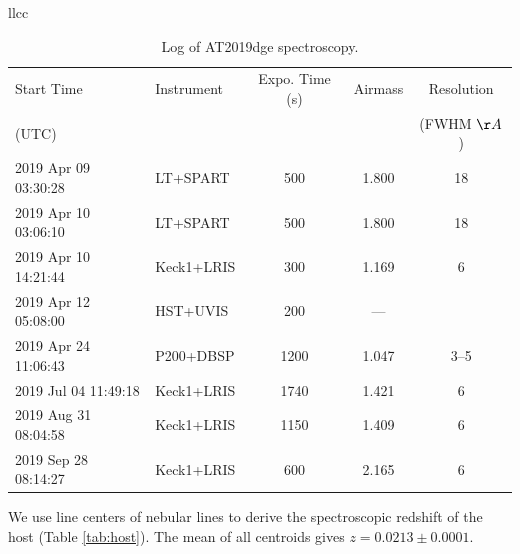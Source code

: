 \documentclass[twocolumn]{aastex63}
\begin{document}
\begin{CJK*}{UTF8}{gbsn}
\begin{table}{llcc}
	\caption{Log of AT2019dge spectroscopy. \label{tab:spec}}
	\centering
	\begin{tabular}{llccc}
	\toprule
	Start Time  & Instrument & Expo. Time (s) & Airmass & Resolution\\
	(UTC) & & & & (FWHM $\AA$)\\
	\midrule
	2019 Apr 09 03:30:28 & LT+SPART  &  500   & 1.800 & 18 \\
	2019 Apr 10 03:06:10 & LT+SPART  &  500   & 1.800 & 18 \\
	2019 Apr 10 14:21:44 & Keck1+LRIS & 300 & 1.169 & 6 \\
	2019 Apr 12 05:08:00 & HST+UVIS & 200 & --- & \\
	2019 Apr 24 11:06:43 & P200+DBSP & 1200 & 1.047 & 3--5\\
	2019 Jul 04 11:49:18   & Keck1+LRIS & 1740 & 1.421 & 6\\
	2019 Aug 31 08:04:58   & Keck1+LRIS & 1150 & 1.409 & 6  \\
	2019 Sep 28 08:14:27   & Keck1+LRIS & 600 & 2.165 & 6\\
	\bottomrule
\end{tabular}
\end{table}

We use line centers of nebular lines to derive the spectroscopic redshift of the host (Table 
\ref{tab:host}). The mean of all centroids gives $z = 0.0213 \pm 0.0001$.


\end{CJK*}
\end{document}
